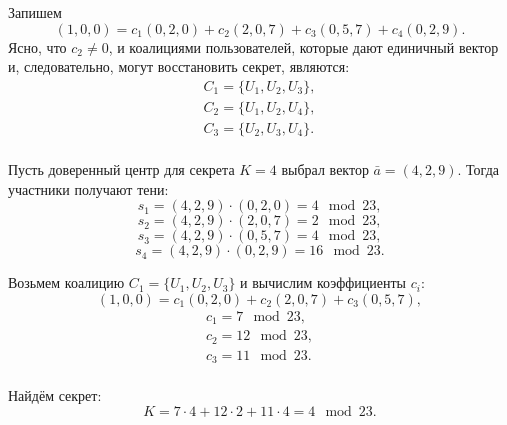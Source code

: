 Запишем
    \[ (1,0,0) = c_1 (0,2,0) + c_2 (2,0,7) + c_3 (0,5,7) + c_4 (0,2,9). \]
Ясно, что $c_2 \neq 0$, и коалициями пользователей, которые дают единичный вектор и, следовательно, могут восстановить секрет, являются:
\[ \begin{array}{l}
    C_1 = \{ U_1, U_2, U_3 \}, \\
    C_2 = \{ U_1, U_2, U_4 \}, \\
    C_3 = \{ U_2, U_3, U_4 \}. \\
\end{array} \]

Пусть доверенный центр для секрета $K=4$ выбрал вектор $\bar{a} = (4, 2, 9)$. Тогда участники получают тени:
    \[ s_1 = (4,2,9) \cdot (0,2,0) = 4 \mod 23, \]
    \[ s_2 = (4,2,9) \cdot (2,0,7) = 2 \mod 23, \]
    \[ s_3 = (4,2,9) \cdot (0,5,7) = 4 \mod 23, \]
    \[ s_4 = (4,2,9) \cdot (0,2,9) = 16 \mod 23. \]

Возьмем коалицию $C_1 = \{ U_1, U_2, U_3 \}$ и вычислим коэффициенты $c_i$:
    \[ (1,0,0) = c_1 (0,2,0) + c_2 (2,0,7) + c_3 (0,5,7), \]
\[ \begin{array}{l}
    c_1 = 7 \mod 23, \\
    c_2 = 12 \mod 23, \\
    c_3 = 11 \mod 23. \\
\end{array} \]

Найдём секрет:
    \[ K = 7 \cdot 4 + 12 \cdot 2 + 11 \cdot 4 = 4 \mod 23.\]
\exampleend
